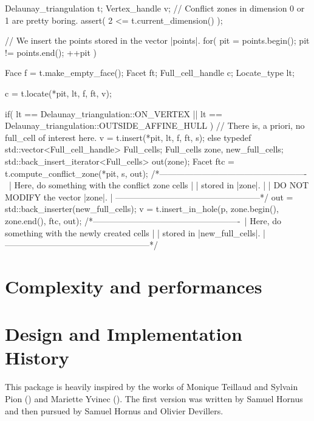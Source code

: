 \begin{ccExampleCode}
Delaunay_triangulation t;
Vertex_handle v;
// Conflict zones in dimension 0 or 1 are pretty boring.
assert( 2 <= t.current_dimension() );

// We insert the points stored in the vector |points|.
for( pit = points.begin(); pit != points.end(); ++pit )
{
    Face             f = t.make_empty_face();
    Facet            ft;
    Full_cell_handle c;
    Locate_type      lt;

    c = t.locate(*pit, lt, f, ft, v);

    if(    lt == Delaunay_triangulation::ON_VERTEX
        || lt == Delaunay_triangulation::OUTSIDE_AFFINE_HULL )
    {
        // There is, a priori, no full_cell of interest here.
        v = t.insert(*pit, lt, f, ft, s);
    }
    else
    {
        typedef std::vector<Full_cell_handle> Full_cells;
        Full_cells zone, new_full_cells;
        std::back_insert_iterator<Full_cells> out(zone);
        Facet ftc = t.compute_conflict_zone(*pit, s, out);
        /*----------------------------------------------------\
        | Here, do something with the conflict zone cells     |
        | stored in |zone|.                                   |
        | DO NOT MODIFY the vector |zone|.                    |
        \----------------------------------------------------*/
        out = std::back_inserter(new_full_cells);
        v = t.insert_in_hole(p, zone.begin(), zone.end(), ftc, out);
        /*----------------------------------------------------\
        |  Here, do something with the newly created cells    |
        |  stored in |new_full_cells|.                        |
        \----------------------------------------------------*/
    }
}
\end{ccExampleCode}

\section{Complexity and performances}


\section{Design and Implementation History}

This package is heavily inspired by the works of
 Monique Teillaud and Sylvain Pion ()
and Mariette Yvinec (\ccc{Triangulation_2}).
The first version was written by Samuel Hornus and then
pursued by Samuel Hornus and Olivier Devillers.
